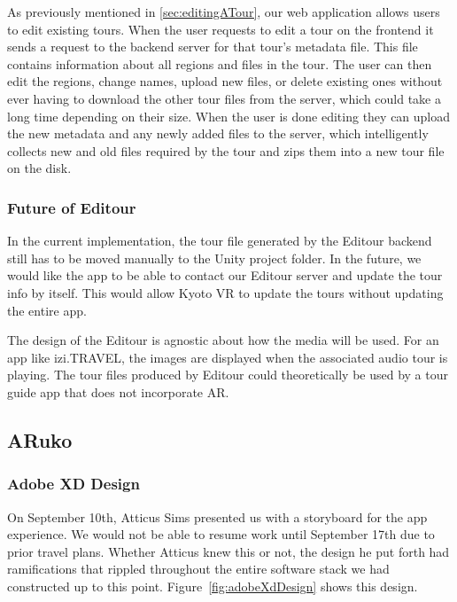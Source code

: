 \documentclass[a4paper, 10pt, american, titlepage]{article}
\begin{document}
As previously mentioned in \ref{sec:editingATour}, our web application allows
users to edit existing tours. When the user requests to edit a tour on the
frontend it sends a request to the backend server for that tour's metadata
file. This file contains information about all regions and files in the tour.
The user can then edit the regions, change names, upload new files, or delete
existing ones without ever having to download the other tour files from the
server, which could take a long time depending on their size. When the user is
done editing they can upload the new metadata and any newly added files to the
server, which intelligently collects new and old files required by the tour and
zips them into a new tour file on the disk.

\subsubsection{Future of Editour}
\label{sec:futureOfEditour}

In the current implementation, the tour file generated by the Editour backend
still has to be moved manually to the Unity project folder. In the future, we
would like the app to be able to contact our Editour server and update the tour
info by itself. This would allow Kyoto VR to update the tours without updating
the entire app.

The design of the Editour is agnostic about how the media will be used. For an
app like izi.TRAVEL, the images are displayed when the associated audio tour is
playing. The tour files produced by Editour could theoretically be used by a
tour guide app that does not incorporate AR. 

\subsection{ARuko}
\label{sec:aruko}

\subsubsection{Adobe XD Design}
\label{sec:adobeXdDesign}
On September 10th, Atticus Sims presented us with a storyboard for the app
experience. We would not be able to resume work until September 17th due to
prior travel plans. Whether Atticus knew this or not, the design he put forth
had ramifications that rippled throughout the entire software stack we had
constructed up to this point. Figure~\ref{fig:adobeXdDesign} shows this design.
\end{document}
